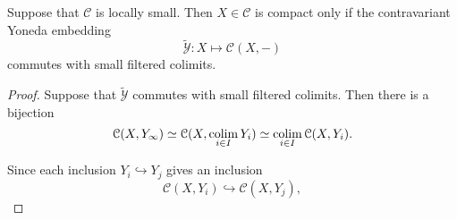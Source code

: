 \documentclass[main.tex]{subfiles}
\begin{document}
\begin{lemma}
  \label{lemma:compact_iff_contravariant_yoneda_commutes_with_colimits}
  Suppose that $\mathcal{C}$ is locally small. Then $X \in \mathcal{C}$ is compact only if the contravariant Yoneda embedding
  \begin{equation*}
    \tilde{\mathcal{Y}}\colon X \mapsto \mathcal{C}(X, -)
  \end{equation*}
  commutes with small filtered colimits.
\end{lemma}
\begin{proof}
  Suppose that $\tilde{\mathcal{Y}}$ commutes with small filtered colimits. Then there is a bijection
  \begin{equation}
    \label{eq:bijection_from_colimit_commutation}
    \mathcal{C}(X, Y_{\infty}) \simeq \mathcal{C}(X, \colim_{i \in I} Y_{i}) \simeq \colim_{i \in I}\mathcal{C}(X, Y_{i}).
  \end{equation}

  Since each inclusion $Y_{i} \hookrightarrow Y_{j}$ gives an inclusion
  \begin{equation*}
    \mathcal{C}(X, Y_{i}) \hookrightarrow \mathcal{C}(X, Y_{j}),
  \end{equation*}
\end{proof}
\end{document}
